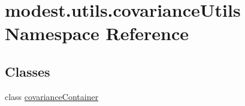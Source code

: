\hypertarget{namespacemodest_1_1utils_1_1covarianceUtils}{}\section{modest.\+utils.\+covariance\+Utils Namespace Reference}
\label{namespacemodest_1_1utils_1_1covarianceUtils}
\subsection*{Classes}
\begin{DoxyCompactItemize}
\item 
class \hyperlink{classmodest_1_1utils_1_1covarianceUtils_1_1covarianceContainer}{covariance\+Container}
\end{DoxyCompactItemize}
